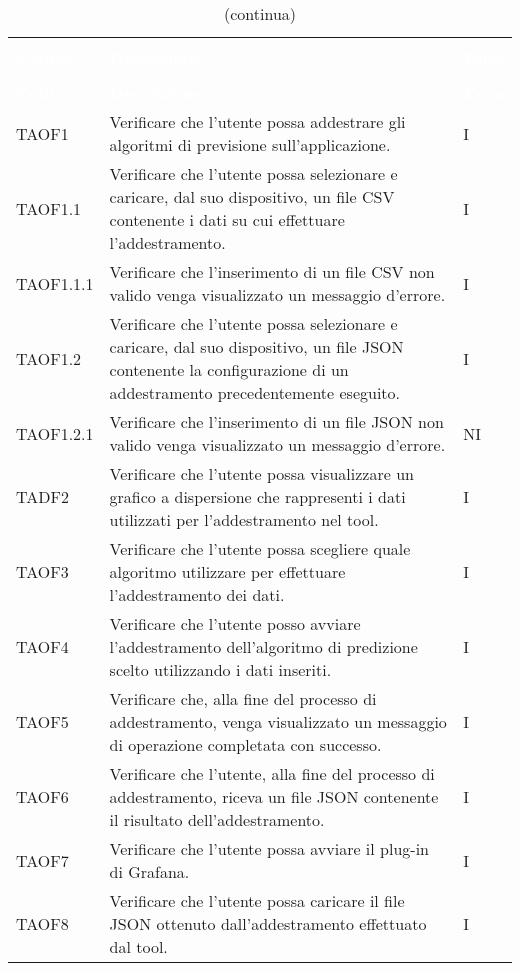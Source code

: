 \begin{longtable}{C{2.5cm} L{8cm} C{2cm}}
\caption{Tabella dei test di accettazione} \\
\textcolor{white}{\textbf{Codice}} &
\textcolor{white}{\textbf{Descrizione}} &
\textcolor{white}{\textbf{Esito}} \\
		\endfirsthead
		\caption[]{(continua)} \\
\textcolor{white}{\textbf{Codice}} &
\textcolor{white}{\textbf{Descrizione}} &
\textcolor{white}{\textbf{Esito}} \\
		\endhead
TAOF1 & Verificare che l’utente possa addestrare gli algoritmi di previsione sull’applicazione. & I \\
TAOF1.1 & Verificare che l’utente possa selezionare e caricare, dal suo dispositivo, un file CSV contenente i dati su cui effettuare l’addestramento. & I\\
TAOF1.1.1 & Verificare che l’inserimento di un file CSV non valido venga visualizzato un messaggio d’errore. & I \\
TAOF1.2 & Verificare che l’utente possa selezionare e caricare, dal suo dispositivo, un file JSON contenente la configurazione di un addestramento precedentemente eseguito. & I\\
TAOF1.2.1 & Verificare che l’inserimento di un file JSON non valido venga visualizzato un messaggio d’errore. & NI \\
TADF2 & Verificare che l’utente possa visualizzare un grafico a dispersione che rappresenti i dati utilizzati per l’addestramento nel tool. & I \\
TAOF3 & Verificare che l’utente possa scegliere quale algoritmo utilizzare per effettuare l’addestramento dei dati. & I \\
TAOF4 & Verificare che l’utente posso avviare l’addestramento dell’algoritmo di predizione scelto utilizzando i dati inseriti. & I \\
TAOF5 & Verificare che, alla fine del processo di addestramento, venga visualizzato un messaggio di operazione completata con successo. & I \\
TAOF6 & Verificare che l’utente, alla fine del processo di addestramento, riceva un file JSON contenente il risultato dell’addestramento. & I\\
TAOF7 & Verificare che l’utente possa avviare il plug-in di Grafana. & I \\
TAOF8 & Verificare che l’utente possa caricare il file JSON ottenuto dall’addestramento effettuato dal tool. & I\\

\end{longtable}
